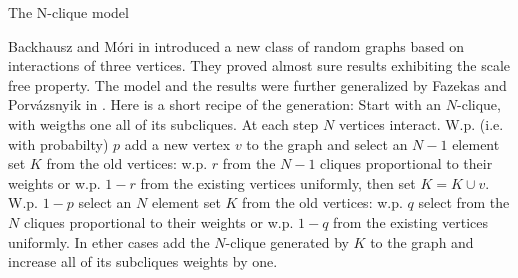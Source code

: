 \begin{block}{The N-clique model}\small

  Backhausz and Móri in \cite{BaMo} introduced a new class of random graphs based on interactions of three vertices. They proved almost sure results exhibiting the scale free property. The model and the results were further generalized by Fazekas and Porvázsnyik in \cite{FaPo}. Here is a short recipe of the generation: Start with an $N$-clique, with weigths one all of its subcliques. At each step $N$ vertices interact. W.p. (i.e. with probabilty) $p$ add a new vertex $v$ to the graph and select an $N-1$ element set $K$ from the old vertices: w.p. $r$ from the $N-1$ cliques proportional to their weights or w.p. $1-r$ from the existing vertices uniformly, then set $K=K\cup{v}$. W.p. $1-p$ select an $N$ element set $K$ from the old vertices: w.p. $q$ select from the $N$ cliques proportional to their weights or w.p. $1-q$ from the existing vertices uniformly. In ether cases add the $N$-clique generated by $K$ to the graph and increase all of its subcliques weights by one.

\end{block}
